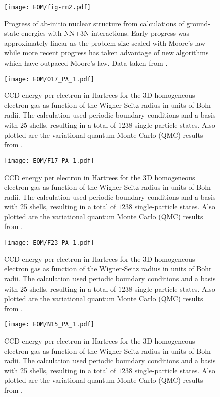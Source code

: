 \documentclass[thesis.tex]{subfiles}
\begin{document}
\begin{figure}[h]
  \centering
  \texttt{[image: EOM/fig-rm2.pdf]}
  \caption{Progress of ab-initio nuclear structure from calculations of ground-state energies with NN+3N interactions.  Early progress was approximately linear as the problem size scaled with Moore's law while more recent progress has taken advantage of new algorithms which have outpaced Moore's law.  Data taken from \cite{HERGERTPRIVATE}.}
  \label{fig:QDrm}
\end{figure}



\begin{figure}[h]
  \texttt{[image: EOM/O17\_PA\_1.pdf]}
  \caption{CCD energy per electron in Hartrees for the 3D homogeneous electron gas as function of the Wigner-Seitz radius in units of Bohr radii. The calculation used periodic boundary conditions and a basis with 25 shells, resulting in a total of $1238$ single-particle states. Also plotted are the variational quantum Monte Carlo (QMC) results from \cite{LOPEZ2006}.}
  \label{fig:QDground}
\end{figure}

\begin{figure}[h]
  \texttt{[image: EOM/F17\_PA\_1.pdf]}
  \caption{CCD energy per electron in Hartrees for the 3D homogeneous electron gas as function of the Wigner-Seitz radius in units of Bohr radii. The calculation used periodic boundary conditions and a basis with 25 shells, resulting in a total of $1238$ single-particle states. Also plotted are the variational quantum Monte Carlo (QMC) results from \cite{LOPEZ2006}.}
  \label{fig:QDground}
\end{figure}

\begin{figure}[h]
  \texttt{[image: EOM/F23\_PA\_1.pdf]}
  \caption{CCD energy per electron in Hartrees for the 3D homogeneous electron gas as function of the Wigner-Seitz radius in units of Bohr radii. The calculation used periodic boundary conditions and a basis with 25 shells, resulting in a total of $1238$ single-particle states. Also plotted are the variational quantum Monte Carlo (QMC) results from \cite{LOPEZ2006}.}
  \label{fig:QDground}
\end{figure}

\begin{figure}[h]
  \texttt{[image: EOM/N15\_PA\_1.pdf]}
  \caption{CCD energy per electron in Hartrees for the 3D homogeneous electron gas as function of the Wigner-Seitz radius in units of Bohr radii. The calculation used periodic boundary conditions and a basis with 25 shells, resulting in a total of $1238$ single-particle states. Also plotted are the variational quantum Monte Carlo (QMC) results from \cite{LOPEZ2006}.}
  \label{fig:QDground}
\end{figure}
\end{document}
